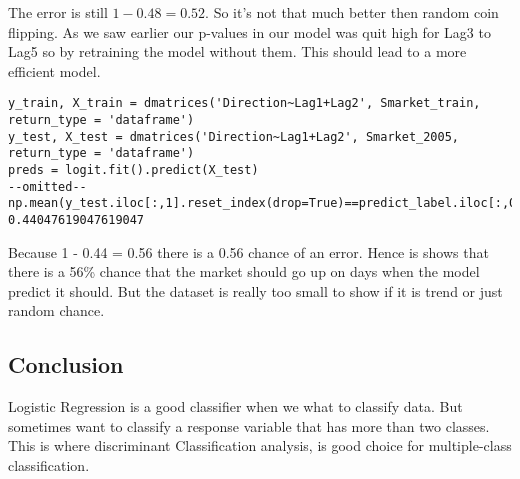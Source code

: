The error is still $1 - 0.48 = 0.52$. So it's not that much better then random coin flipping. As we saw earlier our p-values in our model was quit high for Lag3 to Lag5 so by retraining the model without them. This should lead to a more efficient model. 
\begin{lstlisting}
y_train, X_train = dmatrices('Direction~Lag1+Lag2', Smarket_train, return_type = 'dataframe')
y_test, X_test = dmatrices('Direction~Lag1+Lag2', Smarket_2005, return_type = 'dataframe')
preds = logit.fit().predict(X_test)
--omitted--
np.mean(y_test.iloc[:,1].reset_index(drop=True)==predict_label.iloc[:,0].reset_index(drop=True))
0.44047619047619047
\end{lstlisting}
Because 1 - 0.44 = 0.56 there is a 0.56 chance of an error. Hence is shows that there is a 56\% chance that the market should go up on days when the model predict it should. But the dataset is really too small to show if it is trend or just random chance.

\subsection{Conclusion}
Logistic Regression is a good classifier when we what to classify data. But sometimes want to classify a response variable that has more than two classes. This is where discriminant Classification analysis, is good choice for multiple-class classification.
